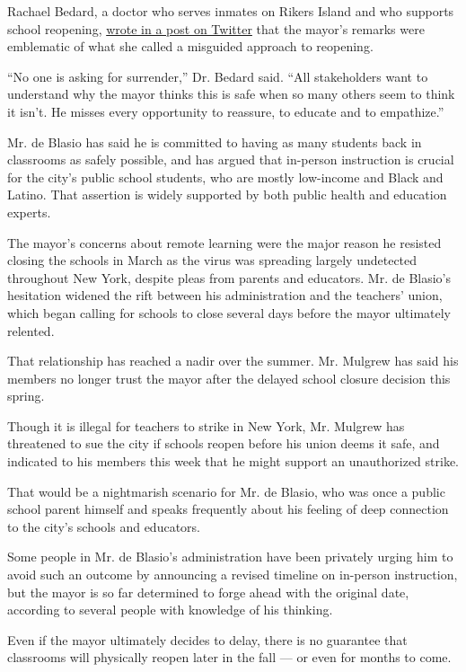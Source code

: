 Rachael Bedard, a doctor who serves inmates on Rikers Island and who
supports school reopening,
\href{https://twitter.com/rachaelbedard/status/1293926522605142017}{wrote
in a post on Twitter} that the mayor's remarks were emblematic of what
she called a misguided approach to reopening.

``No one is asking for surrender,'' Dr. Bedard said. ``All stakeholders
want to understand why the mayor thinks this is safe when so many others
seem to think it isn't. He misses every opportunity to reassure, to
educate and to empathize.''

Mr. de Blasio has said he is committed to having as many students back
in classrooms as safely possible, and has argued that in-person
instruction is crucial for the city's public school students, who are
mostly low-income and Black and Latino. That assertion is widely
supported by both public health and education experts.

The mayor's concerns about remote learning were the major reason he
resisted closing the schools in March as the virus was spreading largely
undetected throughout New York, despite pleas from parents and
educators. Mr. de Blasio's hesitation widened the rift between his
administration and the teachers' union, which began calling for schools
to close several days before the mayor ultimately relented.

That relationship has reached a nadir over the summer. Mr. Mulgrew has
said his members no longer trust the mayor after the delayed school
closure decision this spring.

Though it is illegal for teachers to strike in New York, Mr. Mulgrew has
threatened to sue the city if schools reopen before his union deems it
safe, and indicated to his members this week that he might support an
unauthorized strike.

That would be a nightmarish scenario for Mr. de Blasio, who was once a
public school parent himself and speaks frequently about his feeling of
deep connection to the city's schools and educators.

Some people in Mr. de Blasio's administration have been privately urging
him to avoid such an outcome by announcing a revised timeline on
in-person instruction, but the mayor is so far determined to forge ahead
with the original date, according to several people with knowledge of
his thinking.

Even if the mayor ultimately decides to delay, there is no guarantee
that classrooms will physically reopen later in the fall --- or even for
months to come.

